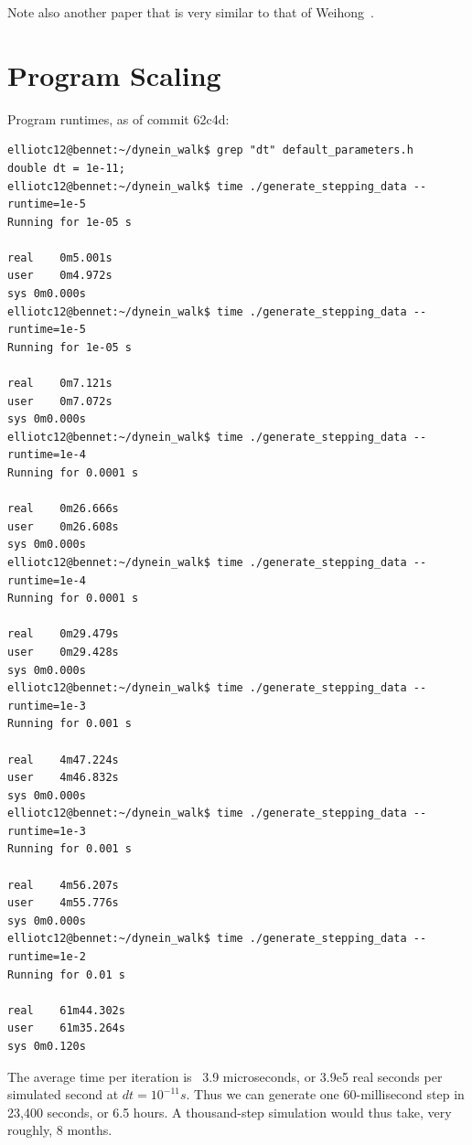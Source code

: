 \documentclass[10pt]{article} %
\begin{document}
Note also another paper that is very similar to that of Weihong~\cite{dewitt2012cytoplasmic}.

\section{Program Scaling}
Program runtimes, as of commit 62c4d:

\begin{verbatim}
elliotc12@bennet:~/dynein_walk$ grep "dt" default_parameters.h 
double dt = 1e-11;
elliotc12@bennet:~/dynein_walk$ time ./generate_stepping_data --runtime=1e-5
Running for 1e-05 s

real	0m5.001s
user	0m4.972s
sys	0m0.000s
elliotc12@bennet:~/dynein_walk$ time ./generate_stepping_data --runtime=1e-5
Running for 1e-05 s

real	0m7.121s
user	0m7.072s
sys	0m0.000s
elliotc12@bennet:~/dynein_walk$ time ./generate_stepping_data --runtime=1e-4
Running for 0.0001 s

real	0m26.666s
user	0m26.608s
sys	0m0.000s
elliotc12@bennet:~/dynein_walk$ time ./generate_stepping_data --runtime=1e-4
Running for 0.0001 s

real	0m29.479s
user	0m29.428s
sys	0m0.000s
elliotc12@bennet:~/dynein_walk$ time ./generate_stepping_data --runtime=1e-3
Running for 0.001 s

real	4m47.224s
user	4m46.832s
sys	0m0.000s
elliotc12@bennet:~/dynein_walk$ time ./generate_stepping_data --runtime=1e-3
Running for 0.001 s

real	4m56.207s
user	4m55.776s
sys	0m0.000s
elliotc12@bennet:~/dynein_walk$ time ./generate_stepping_data --runtime=1e-2
Running for 0.01 s

real	61m44.302s
user	61m35.264s
sys	0m0.120s
\end{verbatim}

The average time per iteration is ~3.9 microseconds, or 3.9e5 real seconds per simulated second at $dt=10^{-11}s$. Thus we can generate one 60-millisecond step in 23,400 seconds, or 6.5 hours. A thousand-step simulation would thus take, very roughly, 8 months.\\
\end{document}
